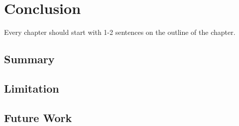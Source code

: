 \chapter{Conclusion}

\begin{center}
Every chapter should start with 1-2 sentences on the outline of the chapter.
\end{center}

\section{Summary}
\section{Limitation}
\section{Future Work}
